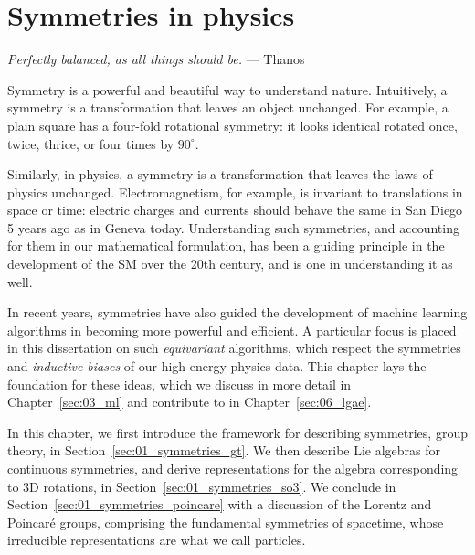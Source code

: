 
\chapter{Symmetries in physics}
\label{sec:01_symmetries}

\begin{center}
	\centering
	\noindent
	\textit{Perfectly balanced, as all things should be.} --- Thanos
\end{center}

Symmetry is a powerful and beautiful way to understand nature. 
Intuitively, a symmetry is a transformation that leaves an object unchanged.
For example, a plain square has a four-fold rotational symmetry: it looks identical rotated once, twice, thrice, or four times by $90^{\circ}$.

Similarly, in physics, a symmetry is a transformation that leaves the laws of physics unchanged.
Electromagnetism, for example, is invariant to translations in space or time: electric charges and currents should behave the same in San Diego 5 years ago as in Geneva today.
Understanding such symmetries, and accounting for them in our mathematical formulation, has been a guiding principle in the development of the SM over the 20th century, and is one in understanding it as well.

In recent years, symmetries have also guided the development of machine learning algorithms in becoming more powerful and efficient.
A particular focus is placed in this dissertation on such \textit{equivariant} algorithms, which respect the symmetries and 
\textit{inductive biases} of our high energy physics data.
This chapter lays the foundation for these ideas, which we discuss in more detail in Chapter~\ref{sec:03_ml} and contribute to in Chapter~\ref{sec:06_lgae}.

In this chapter, we first introduce the framework for describing symmetries, group theory, in Section~\ref{sec:01_symmetries_gt}.
We then describe Lie algebras for continuous symmetries, and derive representations for the algebra corresponding to 3D rotations, in Section~\ref{sec:01_symmetries_so3}.
We conclude in Section~\ref{sec:01_symmetries_poincare} with a discussion of the Lorentz and Poincaré groups, comprising the fundamental symmetries of spacetime, whose irreducible representations are what we call particles.

